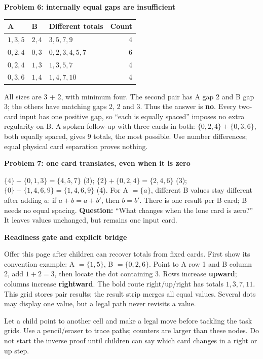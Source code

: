 \documentclass[11pt]{article}
\newcommand{\heading}[1]{\vspace{4pt}{\large\bfseries #1}\par}
\newcommand{\sub}[1]{\textbf{#1}\par}
\newcommand{\sset}[1]{\{#1\}}
\newcommand{\smalltable}{\small\renewcommand{\arraystretch}{1.2}}
\begin{document}
\sub{Problem 6: internally equal gaps are insufficient}
{\smalltable\begin{tabularx}{\linewidth}{@{}p{31mm}p{25mm}Xr@{}}\toprule
A & B & Different totals & Count\\\midrule
$1,3,5$ & $2,4$ & $3,5,7,9$ & 4\\
$0,2,4$ & $0,3$ & $0,2,3,4,5,7$ & 6\\
$0,2,4$ & $1,3$ & $1,3,5,7$ & 4\\
$0,3,6$ & $1,4$ & $1,4,7,10$ & 4\\\bottomrule\end{tabularx}}
All sizes are 3 + 2, with minimum four. The second pair has A gap 2 and B gap 3; the others have matching gaps 2, 2 and 3. Thus the answer is \textbf{no}. Every two-card input has one positive gap, so ``each is equally spaced'' imposes no extra regularity on B. A spoken follow-up with three cards in both: $\sset{0,2,4}+\sset{0,3,6}$, both equally spaced, gives 9 totals, the most possible. Use number differences; equal physical card separation proves nothing.

\sub{Problem 7: one card translates, even when it is zero}
$\sset{4}+\sset{0,1,3}=\sset{4,5,7}$ (3);
$\sset{2}+\sset{0,2,4}=\sset{2,4,6}$ (3);
$\sset{0}+\sset{1,4,6,9}=\sset{1,4,6,9}$ (4).
For A $=\sset{a}$, different B values stay different after adding $a$: if $a+b=a+b'$, then $b=b'$. There is one result per B card; B needs no equal spacing. \textbf{Question:} ``What changes when the lone card is zero?'' It leaves values unchanged, but remains one input card.
\newpage

\heading{Problem 8: a grid becomes a certificate}
\sub{Readiness gate and explicit bridge}
Offer this page after children can recover totals from fixed cards. First show its convention example: A $=\sset{1,5}$, B $=\sset{0,2,6}$. Point to A row 1 and B column 2, add $1+2=3$, then locate the dot containing 3. Rows increase \textbf{upward}; columns increase \textbf{rightward}. The bold route right/up/right has totals $1,3,7,11$. This grid stores pair results; the result strip merges all equal values. Several dots may display one value, but a legal path never revisits a value.

Let a child point to another cell and make a legal move before tackling the task grids. Use a pencil/eraser to trace paths; counters are larger than these nodes. Do not start the inverse proof until children can say which card changes in a right or up step.
\end{document}
